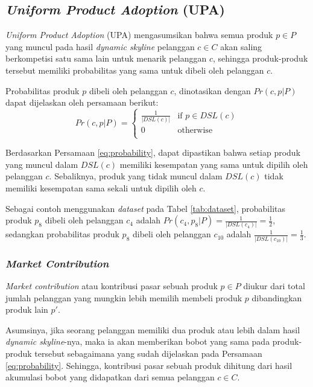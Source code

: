 \subsection{\textit{Uniform Product Adoption} (UPA)}
\tab \textit{Uniform Product Adoption} (UPA) mengasumsikan bahwa semua produk $p \in P$ yang muncul pada hasil \textit{dynamic skyline} pelanggan $c \in C$ akan saling berkompetisi satu sama lain untuk menarik pelanggan $c$, sehingga produk-produk tersebut memiliki probabilitas yang sama untuk dibeli oleh pelanggan $c$.

Probabilitas produk $p$ dibeli oleh pelanggan $c$, dinotasikan dengan $Pr(c, p|P)$ dapat dijelaskan oleh persamaan berikut:
\begin{equation}\label{eq:probability}
Pr(c, p|P) = \left\{
				\begin{array}{ll}
					\frac{1}{|DSL(c)|} & \text{if } p \in DSL(c)\\
					0 & \text{otherwise}\\
				\end{array}
				\right.
\end{equation}

Berdasarkan Persamaan \ref{eq:probability}, dapat dipastikan bahwa setiap produk yang muncul dalam $DSL(c)$ memiliki kesempatan yang sama untuk dipilih oleh pelanggan $c$. Sebaliknya, produk yang tidak muncul dalam $DSL(c)$ tidak memiliki kesempatan sama sekali untuk dipilih oleh $c$.

\pagebreak
Sebagai contoh menggunakan \textit{dataset} pada Tabel \ref{tab:dataset}, probabilitas produk $p_8$ dibeli oleh pelanggan $c_4$ adalah $Pr(c_4, p_8|P) = \frac{1}{|DSL(c_4)|} = \frac{1}{2}$, sedangkan probabilitas produk $p_8$ dibeli oleh pelanggan $c_{10}$ adalah $\frac{1}{|DSL(c_{10})|} = \frac{1}{3}$.

\subsubsection{\textit{Market Contribution}}
\tab \textit{Market contribution} atau kontribusi pasar sebuah produk $p \in P$ diukur dari total jumlah pelanggan yang mungkin lebih memilih membeli produk $p$ dibandingkan produk lain $p'$.

Asumsinya, jika seorang pelanggan memiliki dua produk atau lebih dalam hasil \textit{dynamic skyline}-nya, maka ia akan memberikan bobot yang sama pada produk-produk tersebut sebagaimana yang sudah dijelaskan pada Persamaan \ref{eq:probability}. Sehingga, kontribusi pasar sebuah produk dihitung dari hasil akumulasi bobot yang didapatkan dari semua pelanggan $c \in C$.

